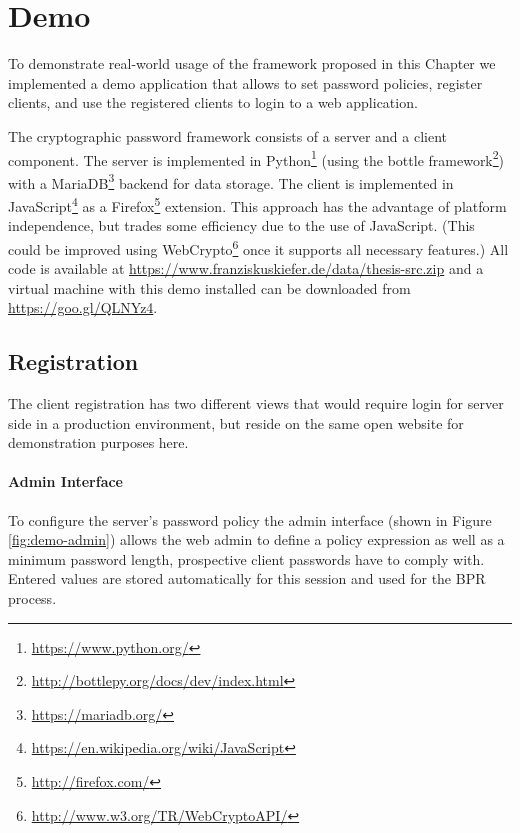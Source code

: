 \section{Demo} \label{sec:vpake-demo}

To demonstrate real-world usage of the framework proposed in this Chapter we implemented a demo application that allows to set password policies, register clients, and use the registered clients to login to a web application.

The cryptographic password framework consists of a server and a client component.
The server is implemented in Python\footnote{\url{https://www.python.org/}} (using the bottle framework\footnote{\url{http://bottlepy.org/docs/dev/index.html}}) with a MariaDB\footnote{\url{https://mariadb.org/}} backend for data storage.
The client is implemented in JavaScript\footnote{\url{https://en.wikipedia.org/wiki/JavaScript}} as a Firefox\footnote{\url{http://firefox.com/}} extension.
This approach has the advantage of platform independence, but trades some efficiency due to the use of JavaScript.
(This could be improved using WebCrypto\footnote{\url{http://www.w3.org/TR/WebCryptoAPI/}} once it supports all necessary features.)
All code is available at \url{https://www.franziskuskiefer.de/data/thesis-src.zip} and a virtual machine with this demo installed can be downloaded from \url{https://goo.gl/QLNYz4}.

\subsection{Registration}
The client registration has two different views that would require login for server side in a production environment, but reside on the same open website for demonstration purposes here.

\paragraph{Admin Interface}
To configure the server's password policy the admin interface (shown in Figure \ref{fig:demo-admin}) allows the web admin to define a policy expression as well as a minimum password length, prospective client passwords have to comply with.
Entered values are stored automatically for this session and used for the \ac{BPR} process.

